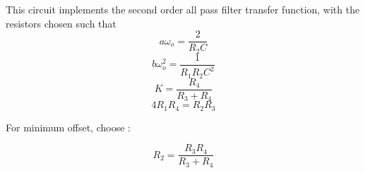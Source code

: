 This circuit implements the second order all pass filter transfer function, with the resistors chosen such that
\begin{equation}
a\omega_{o} = \frac{2}{R_2 C}
\end{equation}
\begin{equation}
b\omega_{o}^2 = \frac{1}{R_1 R_2 C^2}
\end{equation}
\begin{equation}
K = \frac{R_4}{R_3 + R_4}
\end{equation}
\begin{equation}
4R_1 R_4 = R_2 R_3
\end{equation}

For minimum \DC offset, choose \autocite[151-153]{op-amp-circuits-johnson}:

\begin{equation}
R_2 = \frac{R_3 R_4}{R_3 + R_4}
\end{equation}